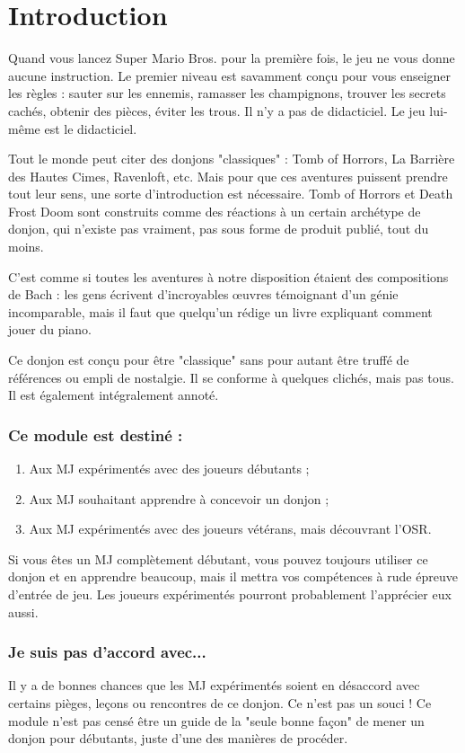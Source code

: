 \chapter{Introduction}

Quand vous lancez Super Mario Bros. pour la première fois, le jeu ne vous donne aucune instruction. 
Le premier niveau est savamment conçu pour vous enseigner les règles : sauter sur les ennemis, ramasser les champignons, trouver les secrets cachés, obtenir des pièces, éviter les trous. 
Il n'y a pas de didacticiel. 
Le jeu lui-même est le didacticiel.

Tout le monde peut citer des donjons "classiques" : Tomb of Horrors, La Barrière des Hautes Cimes, Ravenloft, etc.
Mais pour que ces aventures puissent prendre tout leur sens, une sorte d'introduction est nécessaire. 
Tomb of Horrors et Death Frost Doom sont construits comme des réactions à un certain archétype de donjon, qui n'existe pas vraiment, pas sous forme de produit publié, tout du moins.

C'est comme si toutes les aventures à notre disposition étaient des compositions de Bach : les gens écrivent d'incroyables œuvres témoignant d'un génie incomparable, mais il faut que quelqu'un rédige un livre expliquant comment jouer du piano.

Ce donjon est conçu pour être "classique" sans pour autant être truffé de références ou empli de nostalgie. 
Il se conforme à quelques clichés, mais pas tous. Il est également intégralement annoté.

\subsection{Ce module est destiné :}
\begin{enumerate}
  \item Aux MJ expérimentés avec des joueurs débutants ;
  \item Aux MJ souhaitant apprendre à concevoir un donjon ;
  \item Aux MJ expérimentés avec des joueurs vétérans, mais découvrant l'OSR.
\end{enumerate}
Si vous êtes un MJ complètement débutant, vous pouvez toujours utiliser ce donjon et en apprendre beaucoup, mais il
mettra vos compétences à rude épreuve d'entrée de jeu. 
Les joueurs expérimentés pourront probablement l'apprécier eux aussi.

\subsection{Je suis pas d'accord avec...}
Il y a de bonnes chances que les MJ expérimentés soient en désaccord avec certains pièges, leçons ou rencontres de ce
donjon.
Ce n'est pas un souci ! Ce module n'est pas censé être un guide de la "seule bonne façon" de mener un donjon
pour débutants, juste d'une des manières de procéder.


